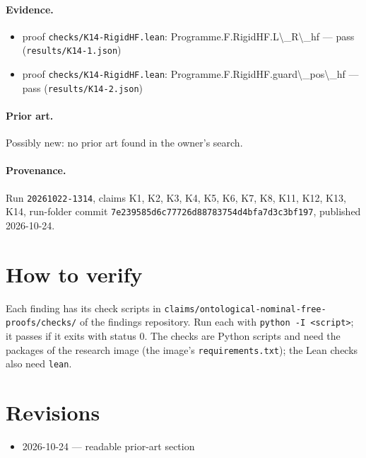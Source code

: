 \documentclass{article}
\begin{document}
\paragraph{Evidence.}
\begin{itemize}
\item proof \texttt{checks/K14-RigidHF.lean}: Programme.F.RigidHF.L\textbackslash{}\_R\textbackslash{}\_hf --- pass (\texttt{results/K14-1.json})
\item proof \texttt{checks/K14-RigidHF.lean}: Programme.F.RigidHF.guard\textbackslash{}\_pos\textbackslash{}\_hf --- pass (\texttt{results/K14-2.json})
\end{itemize}

\paragraph{Prior art.} Possibly new: no prior art found in the owner's search.

\paragraph{Provenance.}
Run \texttt{20261022-1314}, claims K1, K2, K3, K4, K5, K6, K7, K8, K11, K12, K13, K14, run-folder commit \texttt{7e239585d6c77726d88783754d4bfa7d3c3bf197}, published 2026-10-24.

\section{How to verify}

Each finding has its check scripts in \texttt{claims/ontological-nominal-free-proofs/checks/} of the findings repository. Run each with \texttt{python -I <script>}; it passes if it exits with status 0. The checks are Python scripts and need the packages of the research image (the image's \texttt{requirements.txt}); the Lean checks also need \texttt{lean}.

\section{Revisions}

\begin{itemize}
\item 2026-10-24 --- readable prior-art section
\end{itemize}



\end{document}
